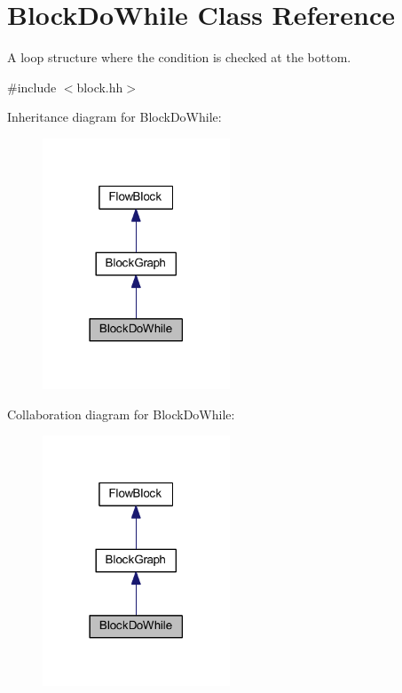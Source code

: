 \hypertarget{class_block_do_while}{}\section{Block\+Do\+While Class Reference}
\label{class_block_do_while}


A loop structure where the condition is checked at the bottom.  




{\ttfamily \#include $<$block.\+hh$>$}



Inheritance diagram for Block\+Do\+While\+:
\nopagebreak
\begin{figure}[H]
\begin{center}
\leavevmode
\includegraphics[width=158pt]{class_block_do_while__inherit__graph}
\end{center}
\end{figure}


Collaboration diagram for Block\+Do\+While\+:
\nopagebreak
\begin{figure}[H]
\begin{center}
\leavevmode
\includegraphics[width=158pt]{class_block_do_while__coll__graph}
\end{center}
\end{figure}
